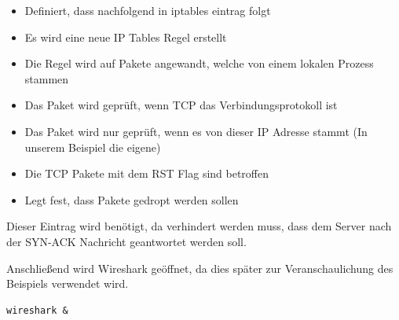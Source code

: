 \begin{itemize}
	\item {} Definiert, dass nachfolgend in iptables eintrag folgt
	\item {} Es wird eine neue IP Tables Regel erstellt
	\item {} Die Regel wird auf Pakete angewandt, welche von einem lokalen Prozess stammen
	\item {} Das Paket wird geprüft, wenn TCP das Verbindungsprotokoll ist
	\item {} Das Paket wird nur geprüft, wenn es von dieser IP Adresse stammt (In unserem Beispiel die eigene)
	\item {} Die TCP Pakete mit dem RST Flag sind betroffen
	\item {} Legt fest, dass Pakete gedropt werden sollen
\end{itemize}

Dieser Eintrag wird benötigt, da verhindert werden muss, dass dem Server nach der SYN-ACK Nachricht geantwortet werden soll. 

Anschließend wird Wireshark geöffnet, da dies später zur Veranschaulichung des Beispiels verwendet wird.
\begin{lstlisting}
wireshark &
\end{lstlisting}

